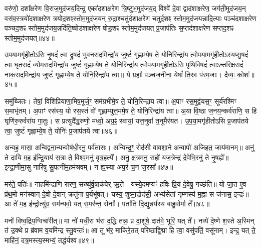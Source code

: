 वरु॑णो॒ दशा᳚क्षरेण वि॒राज॒मुद॑जय॒दिन्द्र॒ एका॑दशाक्षरेण त्रि॒ष्टुभ॒मुद॑जय॒द् विश्वे॑ दे॒वा द्वाद॑शाक्षरेण॒ जग॑ती॒मुद॑जय॒न् वस॑व॒स्त्रयो॑दशाक्षरेण त्रयोद॒शꣴस्तोम॒मुद॑जयन् रु॒द्राश्चतु॑र्दशाक्षरेण चतुर्द॒शꣴ स्तोम॒मुद॑जयन्नादि॒त्याः पञ्च॑दशाक्षरेण पञ्चद॒शꣴ स्तोम॒मुद॑जय॒न्नदि॑ति॒ष्षोड॑शाक्षरेण षोड॒शꣴ स्तोम॒मुद॑जयत् प्र॒जाप॑तिः स॒प्तद॑शाक्षरेण सप्तद॒शꣴ स्तोम॒मुद॑जयत्॥४४॥

{\anuvakamend[{अ॒ज॒य॒त् षट्च॑त्वारिꣳशच्च॥11॥}]}

उ॒प॒या॒मगृ॑हीतो\-ऽसि नृ॒षदं॑ त्वा द्रु॒षदं॑ भुवन॒सद॒मिन्द्रा॑य॒ जुष्टं॑ गृह्णाम्ये॒ष ते॒ योनि॒रिन्द्रा॑य त्वोपया॒मगृ॑हीतो\-ऽस्यप्सु॒षदं॑ त्वा घृत॒सदं॑ व्योम॒सद॒मिन्द्रा॑य॒ जुष्टं॑ गृह्णाम्ये॒ष ते॒ योनि॒रिन्द्रा॑य त्वोपया॒मगृ॑हीतो\-ऽसि पृथिवि॒षदं॑ त्वा\-ऽन्तरिक्ष॒सदं॑ नाक॒सद॒मिन्द्रा॑य॒ जुष्टं॑ गृह्णाम्ये॒ष ते॒ योनि॒रिन्द्रा॑य त्वा॥ ये ग्रहाः᳚ पञ्चज॒नीना॒ येषां᳚ ति॒स्रः प॑रम॒जाः। दैव्यः॒ कोशः॑॥४५॥

समु॑ब्जितः। तेषां॒ विशि॑प्रियाणा॒मिष॒मूर्ज॒ꣳ॒ सम॑ग्रभीमे॒ष ते॒ योनि॒रिन्द्रा॑य त्वा॥ अ॒पाꣳ रस॒मुद्व॑यस॒ꣳ॒ सूर्य॑रश्मिꣳ स॒माभृ॑तम्। अ॒पाꣳ रस॑स्य॒ यो रस॒स्तं वो॑ गृह्णाम्युत्त॒ममे॒ष ते॒ योनि॒रिन्द्रा॑य त्वा॥ अ॒या वि॒ष्ठा ज॒नय॒न्कर्व॑राणि॒ स हि घृणि॑रु॒रुर्वरा॑य गा॒तुः। स प्रत्युदै᳚द्ध॒रुणो॒ मध्वो॒ अग्र॒ꣴ॒ स्वायां॒ यत्त॒नुवां᳚ त॒नूमैर॑यत। उ॒प॒या॒मगृ॑हीतो\-ऽसि प्र॒जाप॑तये त्वा॒ जुष्टं॑ गृह्णाम्ये॒ष ते॒ योनिः॑ प्र॒जाप॑तये त्वा॥४६॥

{\anuvakamend[{कोश॑स्त॒नुवां॒ त्रयो॑दश च॥12॥}]}

अन्वह॒ मासा॒ अन्विद्वना॒न्यन्वोष॑धी॒रनु॒ पर्व॑तासः। अन्विन्द्र॒ꣳ॒ रोद॑सी वावशा॒ने अन्वापो॑ अजिहत॒ जाय॑मानम्॥ अनु॑ ते दायि म॒ह इ॑न्द्रि॒याय॑ स॒त्रा ते॒ विश्व॒मनु॑ वृत्र॒हत्ये᳚। अनु॒ क्ष॒त्रमनु॒ सहो॑ यज॒त्रेन्द्र॑ दे॒वेभि॒रनु॑ ते नृ॒षह्ये᳚॥ इ॒न्द्रा॒णीमा॒सु नारि॑षु सु॒पत्नी॑म॒हम॑श्रवम्। न ह्य॒स्या अप॒रं च॒न ज॒रसा᳚॥४७॥

मर॑ते॒ पतिः॑॥ नाहमि॑न्द्राणि रारण॒ सख्यु॑र्वृ॒षाक॑पेर् ऋ॒ते। यस्ये॒दमप्यꣳ॑ ह॒विः प्रि॒यं दे॒वेषु॒ गच्छ॑ति॥ यो जा॒त ए॒व प्र॑थ॒मो मन॑स्वान् दे॒वो दे॒वान् क्रतु॑ना प॒र्यभू॑षत्। यस्य॒ शुष्मा॒द्रोद॑सी॒ अभ्य॑सेतां नृ॒म्णस्य॑ म॒ह्ना स ज॑नास॒ इन्द्रः॑॥ आ ते॑ म॒ह इ॑न्द्रो॒त्यु॑ग्र॒ सम॑न्यवो॒ यत् स॒मर॑न्त॒ सेनाः᳚। पता॑ति दि॒द्युन्नर्य॑स्य बाहु॒वोर्मा ते᳚॥४८॥

मनो॑ विष्व॒द्रिय॒ग्विचा॑रीत्॥ मा नो॑ मर्धी॒रा भ॑रा द॒द्धि तन्नः॒ प्र दा॒शुषे॒ दात॑वे॒ भूरि॒ यत् ते᳚। नव्ये॑ दे॒ष्णे श॒स्ते अ॒स्मिन् त॑ उ॒क्थे प्र ब्र॑वाम व॒यमि॑न्द्र स्तु॒वन्तः॑॥ आ तू भ॑र॒ माकि॑रे॒तत् परि॑ष्ठाद्वि॒द्मा हि त्वा॒ वसु॑पतिं॒ वसू॑नाम्। इन्द्र॒ यत् ते॒ माहि॑नं॒ दत्र॒मस्त्य॒स्मभ्यं॒ तद्ध॑र्यश्व॥४९॥

